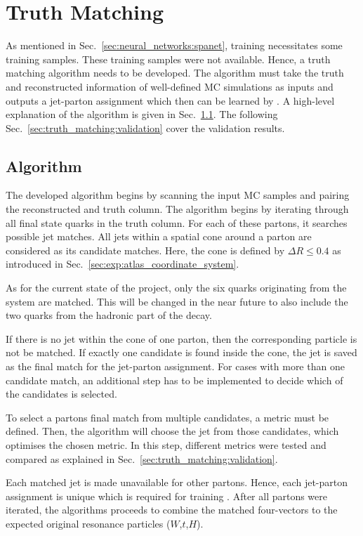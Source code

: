 \documentclass[bachelor,ngerman,english]{GAUBM}
\begin{document}
\chapter{Truth Matching}
\label{ch:truth_matching}
As mentioned in Sec.~\ref{sec:neural_networks:spanet}, training \spanet necessitates some training samples. These training samples were not available. Hence, a truth matching algorithm needs to be developed. The algorithm must take the truth and reconstructed information of well-defined MC simulations as inputs and outputs a jet-parton assignment which then can be learned by \spanet. A high-level explanation of the algorithm is given in Sec.~\ref{sec:truth_matching:algorithm}. The following Sec.~\ref{sec:truth_matching:validation} cover the validation results. 

\section{Algorithm}
\label{sec:truth_matching:algorithm}
The developed algorithm begins by scanning the input MC samples and pairing the reconstructed and truth column. The algorithm begins by iterating through all final state quarks in the truth column. For each of these partons, it searches possible jet matches. All jets within a spatial cone around a parton are considered as its candidate matches. Here, the cone is defined by $\Delta R\leq0.4$ as introduced in Sec.~\ref{sec:exp:atlas_coordinate_system}.

As for the current state of the project, only the six quarks originating from the \ttbar system are matched. This will be changed in the near future to also include the two quarks from the hadronic part of the \HWW decay.

If there is no jet within the cone of one parton, then the corresponding particle is not be matched. If exactly one candidate is found inside the cone, the jet is saved as the final match for the jet-parton assignment. For cases with more than one candidate match, an additional step has to be implemented to decide which of the candidates is selected.

To select a partons final match from multiple candidates, a metric must be defined. Then, the algorithm will choose the jet from those candidates, which optimises the chosen metric. In this step, different metrics were tested and compared as explained in Sec.~\ref{sec:truth_matching:validation}. 

Each matched jet is made unavailable for other partons. Hence, each jet-parton assignment is unique which is required for training \spanet. After all partons were iterated, the algorithms proceeds to combine the matched four-vectors to the expected original resonance particles ($W$,$t$,$H$).
\end{document}
